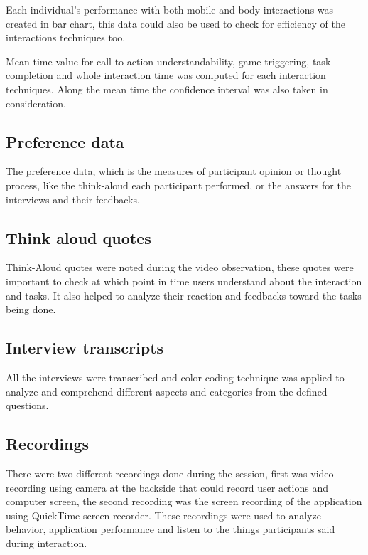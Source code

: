 Each individual's performance with both mobile and body interactions was created in bar chart, this data could also be used to check for efficiency of the interactions techniques too.
 
Mean time value for call-to-action understandability, game triggering, task completion and whole interaction time was computed for each interaction techniques. Along the mean time the confidence interval was also taken in consideration.

\subsection{Preference data}
The preference data, which is the measures of participant opinion or thought process, like the think-aloud each participant performed, or the answers for the interviews and their feedbacks.

\subsection{Think aloud quotes}
Think-Aloud quotes were noted during the video observation, these quotes were important to check at which point in time users understand about the interaction and tasks. It also helped to analyze their reaction and feedbacks toward the tasks being done.

\subsection{Interview transcripts}
All the interviews were transcribed and color-coding technique was applied to analyze and comprehend different aspects and categories from the defined questions.


\subsection{Recordings}
There were two different recordings done during the session, first was video recording using camera at the backside that could record user actions and computer screen, the second recording was the screen recording of the application using QuickTime screen recorder. These recordings were used to analyze behavior, application performance and listen to the things participants said during interaction.


